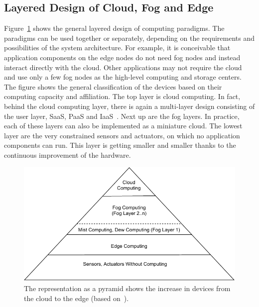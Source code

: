 \documentclass[english,version-2019-11]{uzl-thesis}
\begin{document}
\subsection{Layered Design of Cloud, Fog and Edge}
Figure~\ref{Computing_Pyramid} shows the general layered design of computing paradigms.
The paradigms can be used together or separately,
depending on the requirements and possibilities of the system architecture.
For example, it is conceivable that application components
on the edge nodes do not need fog nodes and instead interact
directly with the cloud. Other applications may not
require the cloud and use only a few fog nodes as the high-level
computing and storage centers. The figure shows the general
classification of the devices based on their computing
capacity and affiliation.
The top layer is cloud computing. In fact,
behind the cloud computing layer, there is again a multi-layer
design consisting of the user layer, SaaS, PaaS and IaaS~\cite{simulator_CloudSim}.
Next up are the fog layers. In practice, each of these layers can
also be implemented as a miniature cloud.
The lowest layer are the very constrained
sensors and actuators, on which no application components can run.
This layer is getting smaller and smaller thanks to the continuous
improvement of the hardware.
\begin{figure}[htpb]
  \centering
  \includegraphics{Computing_Pyramid.pdf}
  \caption{The representation as a pyramid shows the increase in devices
  from the cloud to the edge (based on~\cite{DemystifyingFog}).}
  \label{Computing_Pyramid}
\end{figure}
\end{document}
